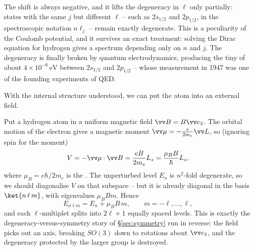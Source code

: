 The shift is always negative, and it lifts the degeneracy in $\ell$ only partially: states with the same $j$ but different $\ell$ -- such as $2s_{1/2}$ and $2p_{1/2}$, in the spectroscopic notation $n\ell_j$ -- remain exactly degenerate. This is a peculiarity of the Coulomb potential, and it survives an exact treatment: solving the Dirac equation for hydrogen gives a spectrum depending only on $n$ and $j$. The degeneracy is finally broken by quantum electrodynamics, producing the tiny  of about $4\times10^{-6}\,\mathrm{eV}$ between $2s_{1/2}$ and $2p_{1/2}$ -- whose measurement in 1947 was one of the founding experiments of QED.

\begin{center}
\end{center}

With the internal structure understood, we can put the atom into an external field.

\begin{example}
    Put a hydrogen atom in a uniform magnetic field $\vv B = B \vv e_3$. The orbital motion of the electron gives a magnetic moment $\vv\mu = -\frac{e}{2m_e}\vv L$, so (ignoring spin for the moment)
    $$
    V = -\vv\mu\cdot\vv B = \frac{eB}{2m_e}L_z = \frac{\mu_B B}{\hbar}L_z,
    $$
    where $\mu_B = e\hbar/2m_e$ is the . The unperturbed level $E_n$ is $n^2$-fold degenerate, so we should diagonalise $V$ on that subspace -- but it is already diagonal in the basis $\ket{n\,\ell\,m}$, with eigenvalues $\mu_B B m$. Hence
    $$
    E_{n\ell m} = E_n + \mu_B B\, m, \qquad m = -\ell,\dots,\ell,
    $$
    and each $\ell$-multiplet splits into $2\ell+1$ equally spaced levels. This is exactly the degeneracy-versus-symmetry story of \S\ref{sec:symmetry} run in reverse: the field picks out an axis, breaking $SO(3)$ down to rotations about $\vv e_3$, and the degeneracy protected by the larger group is destroyed.
\end{example}

